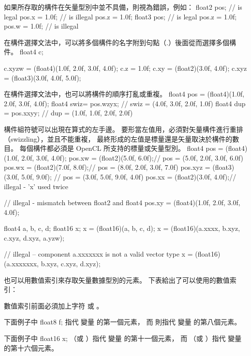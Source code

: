 如果所存取的構件在矢量型別中並不具備，則視為錯誤，例如：
\startclc
float2 pos;	// is legal
pos.x = 1.0f;	// is illegal
pos.z = 1.0f;
float3 pos;	// is legal
pos.z = 1.0f;
pos.w = 1.0f;	// is illegal
\stopclc

在構件選擇文法中，可以將多個構件的名字附到句點（.）後面從而選擇多個構件。
\startclc
float4 c;

c.xyzw = (float4)(1.0f, 2.0f, 3.0f, 4.0f);
c.z = 1.0f;
c.xy = (float2)(3.0f, 4.0f);
c.xyz = (float3)(3.0f, 4.0f, 5.0f);
\stopclc

在構件選擇文法中，也可以將構件的順序打亂或重複。
\startclc
float4 pos = (float4)(1.0f, 2.0f, 3.0f, 4.0f);
float4 swiz= pos.wzyx; // swiz = (4.0f, 3.0f, 2.0f, 1.0f)
float4 dup = pos.xxyy; // dup = (1.0f, 1.0f, 2.0f, 2.0f)
\stopclc

構件組符號可以出現在算式的左手邊。
要形當左值用，必須對矢量構件進行重排（swizzling），並且不能重複，
最終形成的左值是標量還是矢量取決於構件的數目。
每個構件都必須是 OpenCL 所支持的標量或矢量型別。
\startclc
float4 pos = (float4)(1.0f, 2.0f, 3.0f, 4.0f);
pos.xw = (float2)(5.0f, 6.0f);// pos = (5.0f, 2.0f, 3.0f, 6.0f)
pos.wx = (float2)(7.0f, 8.0f);// pos = (8.0f, 2.0f, 3.0f, 7.0f)
pos.xyz = (float3)(3.0f, 5.0f, 9.0f); // pos = (3.0f, 5.0f, 9.0f, 4.0f)
pos.xx = (float2)(3.0f, 4.0f);// illegal - 'x' used twice

// illegal - mismatch between float2 and float4
pos.xy = (float4)(1.0f, 2.0f, 3.0f, 4.0f);

float4 a, b, c, d;
float16 x;
x = (float16)(a, b, c, d);
x = (float16)(a.xxxx, b.xyz, c.xyz, d.xyz, a.yzw);

// illegal – component a.xxxxxxx is not a valid vector type
x = (float16)(a.xxxxxxx, b.xyz, c.xyz, d.xyz);
\stopclc

也可以用數值索引來存取矢量數據型別的元素。
下表給出了可以使用的數值索引：

{}

數值索引前面必須加上字符  或 。

下面例子中
\startclc
float8	f;
\stopclc
{} 指代  變量  的第一個元素，
而  則指代  變量  的第八個元素。

下面例子中
\startclc
float16	x;
\stopclc
{} （或 ）指代  變量  的第十一個元素，
而  （或 ）指代  變量  的第十六個元素。

